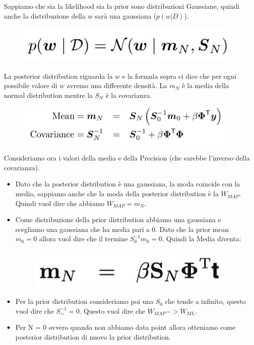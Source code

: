 \documentclass[14pt]{extreport}
\begin{document}
Sappiamo che sia la likelihood sia la prior sono distribuzioni Gaussiane, quindi anche la distribuzione della $w$ sarà una gaussiana ($p(w|D)$).

\begin{figure}[H]
	\centering
	\includegraphics[width=0.7\linewidth]{127.jpeg}
\end{figure}

La posterior distribution riguarda la $w$ e la formula sopra ci dice che per ogni possibile valore di $w$ avremo una differente densità. La $m_N$ è la
media della normal distribution mentre la $S_N$ è la covarianza.

\begin{figure}[H]
	\centering
	\includegraphics[width=0.6\linewidth]{128.jpeg}
\end{figure}

Consideriamo ora i valori della media e della Precision (che sarebbe l'inverso della covarianza).
\begin{itemize}
	\item Dato che la posterior distribution è una gaussiana, la moda coincide con la media, sappiamo anche che la moda della posterior distribution è
	      la $W_{MAP}$. Quindi vuol dire che abbiamo $W_{MAP} = m_N$.
	\item Come distribuzione della prior distribution abbiamo una gaussiana e scegliamo una gaussiana che ha media pari a 0. Dato che la prior mean
		      $m_0 = 0$ allora vuol dire che il termine $S_0^{-1}m_0 = 0$. Quindi la Media diventa: \begin{figure}[H]
		      \centering
		      \includegraphics[width=0.3\linewidth]{129.jpeg}
	      \end{figure}
	\item Per la prior distribution consideriamo poi una $S_0$ che tende a infinito, questo vuol dire che $S_=^{-1} = 0$. Questo vuol dire che
	$W_{MAP}-> W_{ML}$.
	\item Per N = 0 ovvero quando non abbiamo data point allora otteniamo come posterior distribution di nuovo la prior distribution.
\end{itemize}
\end{document}
